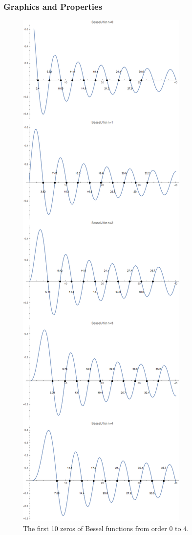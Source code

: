 \documentclass[letterpaper,10pt,english]{sphinxmanual}
\begin{document}
\subsubsection{Graphics and Properties}
\label{special-functions:graphics-and-properties}\begin{figure}[htbp]
\centering
\capstart

\includegraphics{BesselZeros.png}
\caption{The first 10 zeros of Bessel functions from order 0 to 4.}\end{figure}
\end{document}
